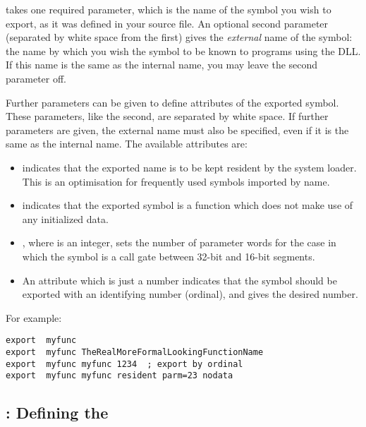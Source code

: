  takes one required parameter, which is the name of the
symbol you wish to export, as it was defined in your source file. An
optional second parameter (separated by white space from the first)
gives the \emph{external} name of the symbol: the name by which you
wish the symbol to be known to programs using the DLL. If this name
is the same as the internal name, you may leave the second parameter
off.

Further parameters can be given to define attributes of the exported
symbol. These parameters, like the second, are separated by white
space. If further parameters are given, the external name must also
be specified, even if it is the same as the internal name. The
available attributes are:

\begin{itemize}
    \item{ indicates that the exported name is
        to be kept resident by the system loader. This is
        an optimisation for frequently used symbols imported
        by name.}

    \item{ indicates that the exported symbol
        is a function which does not make use of any initialized
        data.}

    \item{, where  is an integer, sets
        the number of parameter words for the case in which
        the symbol is a call gate between 32-bit and 16-bit
        segments.}

    \item{An attribute which is just a number indicates that
        the symbol should be exported with an identifying
        number (ordinal), and gives the desired number.}
\end{itemize}

For example:

\begin{lstlisting}
export  myfunc
export  myfunc TheRealMoreFormalLookingFunctionName
export  myfunc myfunc 1234  ; export by ordinal
export  myfunc myfunc resident parm=23 nodata
\end{lstlisting}

\subsection{: Defining the }
\label{subsec:dotdotstart}

